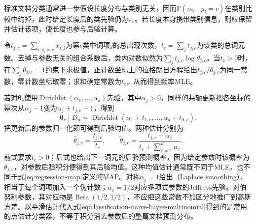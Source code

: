 标准文档分类通常进一步假设长度分布与类别无关，因而$\mathbb{P}(m_i\mid y_i=c)$在类别比较中约掉，此时给定长度后的类先验仍为$\pi_c$。若长度本身携带类别信息，则应保留并估计该项，使长度也参与后验计算。

令$t_{j,c}=\sum_{i:y_i=c}x_{i,j}$为第$c$类中词项$j$的总出现次数，$t_c=\sum_jt_{j,c}$为该类的总词元数。去掉与参数无关的组合系数后，类内对数似然为$\sum_jt_{j,c}\log\theta_{j,c}$。当$t_c>0$时，在$\sum_j\theta_{j,c}=1$约束下求极值，正计数坐标上的拉格朗日方程给出$t_{j,c}/\theta_{j,c}$为同一常数，零计数坐标取零；求和确定常数为$t_c$，从而得到频率MLE。

若对$\bm{\theta}_c$使用$\operatorname{Dirichlet}(\alpha_1,\ldots,\alpha_d)$先验，其中$\alpha_j>0$，同样的共轭更新把各坐标的幂次从$\alpha_j-1$变为$\alpha_j+t_{j,c}-1$，得到
\[
  \bm{\theta}_c\mid D_n
  \sim\operatorname{Dirichlet}
    (\alpha_1+t_{1,c},\ldots,\alpha_d+t_{d,c}).
\]
把更新后的参数归一化即可得到后验均值。两种估计分别为
\begin{equation}
  \label{eq:classification-naive-bayes-smoothing}
  \hat\theta_{j,c}=\frac{t_{j,c}}{t_c},
  \qquad
  \tilde\theta_{j,c}
  =\frac{t_{j,c}+\alpha_j}
         {t_c+\sum_{r=1}^{d}\alpha_r}.
\end{equation}
前式要求$t_c>0$；后式也给出下一词元的后验预测概率，因为给定参数时该概率为$\theta_{j,c}$，对参数后验积分便得到其后验均值。这种均值估计通常既不同于MLE，也不同于式\eqref{eq:regression-map}定义的MAP。对称$\alpha_j=1$给出（Laplace smoothing），相当于每个词项加入一个伪计数；$\alpha_j=1/2$对应多项式参数的Jeffreys先验。对伯努利参数，其对应物是$\operatorname{Beta}(1/2,1/2)$，不应把这些常数不加区分地推广到高斯方差。以平滑估计代入式\eqref{eq:classification-naive-bayes-multinomial}得到的是常用的点估计分类器，不等于积分消去参数后的整篇文档预测分布。

